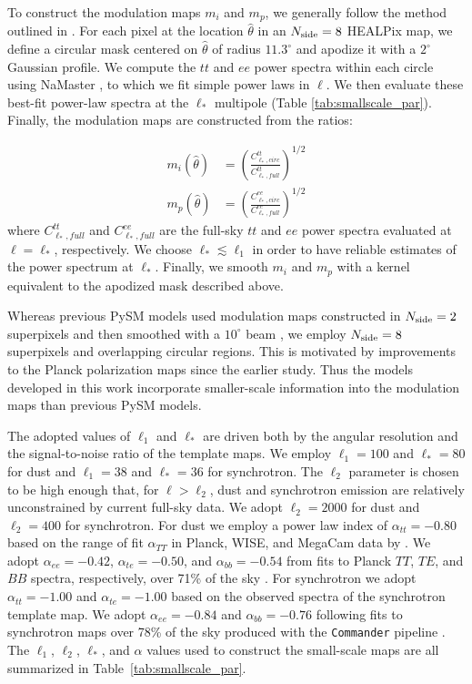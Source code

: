 \documentclass[twocolumn]{aastex631}
\begin{document}
To construct the modulation maps $m_i$ and $m_p$, we generally follow the method outlined in \citet{Thorne:2017}. For each pixel at the location $\hat{\theta}$ in an $N_{\rm side} = 8$ HEALPix map, we define a circular mask centered on $\hat{\theta}$ of radius $11.3^\circ$  and apodize it with a $2^\circ$ Gaussian profile. We compute the $tt$ and $ee$ power spectra within each circle using NaMaster \citep{Alonso:2019}, to which we fit simple power laws in $\ell$. We then evaluate these best-fit power-law spectra at the $\ell_*$ multipole (Table \ref{tab:smallscale_par}). Finally, the modulation maps are constructed from the ratios:

\begin{align}
\label{eq:mod_maps}
    m_i\left(\hat{\theta}\right) &= \left(\frac{C^{tt}_{\ell_*,circ}}{C^{tt}_{\ell_*,full}}\right)^{1/2} \\
    m_p\left(\hat{\theta}\right) &= \left(\frac{C^{ee}_{\ell_*,circ}}{C^{ee}_{\ell_*,full}}\right)^{1/2} \label{eq:mod_maps2}
\end{align}
where $C^{tt}_{\ell_*,full}$ and $C^{ee}_{\ell_*,full}$ are the full-sky $tt$ and $ee$ power spectra evaluated at $\ell = \ell_*$, respectively. We choose $\ell_* \lesssim \ell_1$ in order to have reliable estimates of the power spectrum at $\ell_*$. Finally, we smooth $m_i$ and $m_p$ with a kernel equivalent to the apodized mask described above. 

Whereas previous PySM models used modulation maps constructed in $N_{\rm side} = 2$ superpixels and then smoothed with a $10^\circ$ beam \citep{Thorne:2017}, we employ $N_{\rm side} = 8$ superpixels and overlapping circular regions. This is motivated by improvements to the Planck polarization maps since the earlier study. Thus the models developed in this work incorporate smaller-scale information into the modulation maps than previous PySM models.
  
The adopted values of $\ell_1$ and $\ell_*$ are driven both by the angular resolution and the signal-to-noise ratio of the template maps. We employ $\ell_1=100$ and $\ell_*=80$ for dust and $\ell_1=38$ and $\ell_*=36$ for synchrotron. The $\ell_2$ parameter is chosen to be high enough that, for $\ell > \ell_2$, dust and synchrotron emission are relatively unconstrained by current full-sky data. We adopt  $\ell_2=2000$ for dust and $\ell_2 = 400$ for synchrotron. For dust we employ a power law index of $\alpha_{tt} = -0.80$ based on the range of fit $\alpha_{TT}$ in Planck, WISE, and MegaCam data by \citet{Miville-Deschenes:2016}. We adopt $\alpha_{ee} = -0.42$, $\alpha_{te} = -0.50$, and $\alpha_{bb} = -0.54$ from fits to Planck $TT$, $TE$, and $BB$ spectra, respectively, over 71\% of the sky \citep{planck2016-l11A}. For synchrotron we adopt $\alpha_{tt} = -1.00$ and $\alpha_{te} = -1.00$ based on the observed spectra of the synchrotron template map. We adopt $\alpha_{ee} = -0.84$ and $\alpha_{bb} = -0.76$ following fits to synchrotron maps over 78\% of the sky produced with the \texttt{Commander} pipeline \citep{planck2016-l04}. The $\ell_1$, $\ell_2$, $\ell_*$, and $\alpha$ values used to construct the small-scale maps are all summarized in Table~\ref{tab:smallscale_par}.
\end{document}
